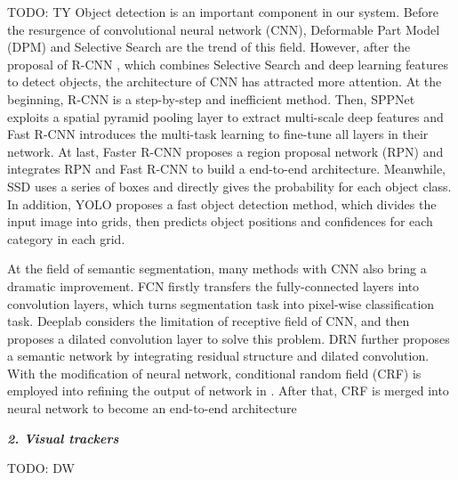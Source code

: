 \documentclass[10pt,twocolumn,letterpaper]{article}
\begin{document}
TODO: TY
Object detection is an important component in our system. Before the resurgence of convolutional neural network (CNN), Deformable Part Model (DPM) \cite{felzenszwalb2008discriminatively} and Selective Search \cite{Uijlings2013Selective} are the trend of this field. However, after the proposal of R-CNN \cite{girshick2014rich}, which combines Selective Search and deep learning features to detect objects, the architecture of CNN has attracted more attention. At the beginning, R-CNN is a step-by-step and inefficient method. Then, SPPNet \cite{He2015Spatial} exploits a spatial pyramid pooling layer to extract multi-scale deep features and Fast R-CNN \cite{Girshick2015Fast} introduces the multi-task learning to fine-tune all layers in their network. At last, Faster R-CNN \cite{Ren2015Faster} proposes a region proposal network (RPN) and integrates RPN and Fast R-CNN to build a end-to-end architecture. Meanwhile, SSD \cite{liu2016ssd} uses a series of boxes and directly gives the probability for each object class. In addition, YOLO \cite{redmon2016you} proposes a fast object detection method, which divides the input image into grids, then predicts object positions and confidences for each category in each grid.

At the field of semantic segmentation, many methods with CNN also bring a dramatic improvement. FCN \cite{long2015fully} firstly transfers the fully-connected layers into convolution layers, which turns segmentation task into pixel-wise classification task. Deeplab \cite{chen2016deeplab} considers the limitation of receptive field of CNN, and then proposes a dilated convolution layer to solve this problem. DRN \cite{yu2017dilated} further proposes a semantic network by integrating residual structure and dilated convolution. With the modification of neural network, conditional random field (CRF) is employed into refining the output of network in \cite{chen2016deeplab}. After that, CRF is merged into neural network to become an end-to-end architecture \cite{liu2015semantic,zheng2015conditional,arnab2016higher}

\textbf{\emph{2. Visual trackers}}

TODO: DW

\end{document}
